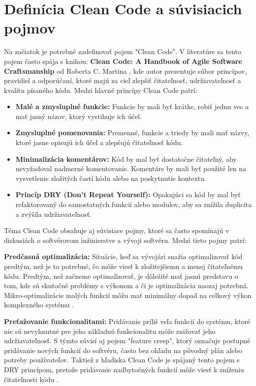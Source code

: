 \section{Definícia Clean Code a súvisiacich pojmov}

Na začiatok je potrebné zadefinovať pojem "Clean Code". V literatúre sa tento pojem často spája s knihou: \textbf{Clean Code: A Handbook of Agile Software Craftsmanship} od Roberta C. Martina \cite{CLEANCODE_MARTIN2008}, kde autor prezentuje súbor princípov, pravidiel a odporúčaní, ktoré majú za cieľ zlepšiť čitateľnosť, udržiavateľnosť a kvalitu písaného kódu. Medzi hlavné princípy Clean Code patrí:

\begin{itemize}
    \item \textbf{Malé a zmysluplné funkcie:} Funkcie by mali byť krátke, robiť jednu vec a mať jasný názov, ktorý vystihuje ich účel.
    
    \item \textbf{Zmysluplné pomenovania:} Premenné, funkcie a triedy by mali mať názvy, ktoré jasne opisujú ich účel a zlepšujú čitateľnosť kódu.
    
    \item \textbf{Minimalizácia komentárov:} Kód by mal byť dostatočne čitateľný, aby nevyžadoval nadmerné komentovanie. Komentáre by mali byť použité len na vysvetlenie zložitých častí kódu alebo na poskytnutie kontextu.
    
    \item \textbf{Princíp DRY (Don't Repeat Yourself):} Opakujúci sa kód by mal byť refaktorovaný do samostatných funkcií alebo modulov, aby sa znížila duplicita a zvýšila udržiavateľnosť.
\end{itemize}

Téma Clean Code obsahuje aj súvisiace pojmy, ktoré sa často spomínajú v diskusiách o softvérovom inžinierstve a vývoji softvéru. Medzi tieto pojmy patrí:

\noindent\textbf{Predčasná optimalizácia:} Situácie, keď sa vývojári snažia optimalizovať kód predtým, než je to potrebné, čo môže viesť k zložitejšiemu a menej čitateľnému kódu. Predtým, než začneme optimalizovať, je dôležité mať jasnú predstavu o tom, kde sú skutočné problémy s výkonom a či je optimalizácia naozaj potrebná. Mikro-optimalizácie malých funkcií môžu mať minimálny dopad na celkový výkon komplexného systému \cite{CLEANCODE_MARTIN2008}.

\noindent\textbf{Preťažovanie funkcionalitami:} Pridávanie príliš veľa funkcií do systému, ktoré nie sú nevyhnutné pre jeho základnú funkcionalitu môže znižovať jeho udržiavateľnosť. S týmto súvisí aj pojem "feature creep", ktorý označuje postupné pridávanie nových funkcií do softvéru, často bez ohľadu na pôvodný plán alebo potreby používateľov. Taktiež z hľadiska Clean Code je spájaný tento pojem s DRY princípom, pretože pridávanie nadbytočných funkcií môže viesť k zníženiu čitateľnosti kódu \cite{CLEANCODE_MARTIN2008}.


